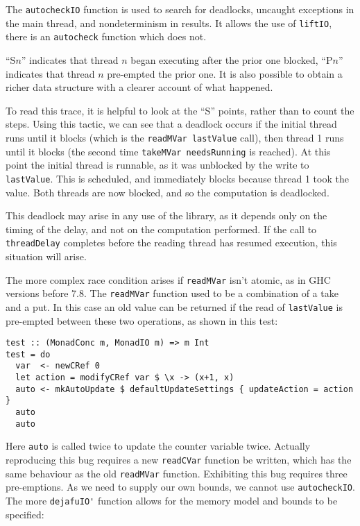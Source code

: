 The \verb|autocheckIO| function is used to search for deadlocks,
uncaught exceptions in the main thread, and nondeterminism in
results. It allows the use of \verb|liftIO|, there is an
\verb|autocheck| function which does not.

``S$n$'' indicates that thread $n$ began executing after the prior one
blocked, ``P$n$'' indicates that thread $n$ pre-empted the prior
one. It is also possible to obtain a richer data structure with a
clearer account of what happened.

To read this trace, it is helpful to look at the ``S'' points, rather
than to count the steps. Using this tactic, we can see that a deadlock
occurs if the initial thread runs until it blocks (which is the
\verb|readMVar lastValue| call), then thread 1 runs until it blocks
(the second time \verb|takeMVar needsRunning| is reached). At this
point the initial thread is runnable, as it was unblocked by the write
to \verb|lastValue|. This is scheduled, and immediately blocks because
thread 1 took the value. Both threads are now blocked, and so the
computation is deadlocked.

This deadlock may arise in any use of the library, as it depends only
on the timing of the delay, and not on the computation performed. If
the call to \verb|threadDelay| completes before the reading thread has
resumed execution, this situation will arise.

The more complex race condition arises if \verb|readMVar| isn't
atomic, as in GHC versions before 7.8. The \verb|readMVar| function
used to be a combination of a take and a put. In this case an old
value can be returned if the read of \verb|lastValue| is pre-empted
between these two operations, as shown in this test:

\begin{verbatim}
test :: (MonadConc m, MonadIO m) => m Int
test = do
  var  <- newCRef 0
  let action = modifyCRef var $ \x -> (x+1, x)
  auto <- mkAutoUpdate $ defaultUpdateSettings { updateAction = action }
  auto
  auto
\end{verbatim}

Here \verb|auto| is called twice to update the counter variable
twice. Actually reproducing this bug requires a new \verb|readCVar|
function be written, which has the same behaviour as the old
\verb|readMVar| function. Exhibiting this bug requires three
pre-emptions. As we need to supply our own bounds, we cannot use
\verb|autocheckIO|. The more \verb|dejafuIO'| function allows for the
memory model and bounds to be specified:

